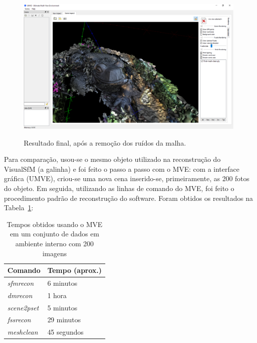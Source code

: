 \begin{figure}[!h]
	\centering
	\caption{%
	Resultado final, após a remoção dos ruídos da malha.
	}
	\includegraphics[width=1\linewidth]{figs/mvemeshclean.png}
		\label{fig:MVEMeshClean}
\end{figure} 

\newpage

Para comparação, usou-se o mesmo objeto utilizado na reconstrução do VisualSfM (a
galinha) e foi feito o passo a passo com o MVE: com a interface gráfica (UMVE),
criou-se uma nova cena inserido-se, primeiramente, as 200 fotos do objeto. Em
seguida, utilizando as linhas de comando do MVE, foi feito o procedimento padrão
de reconstrução do software. Foram obtidos os resultados na Tabela~\ref{tab:galinha200mve}:

\begin{table}[!h]
\centering
\caption{Tempos obtidos usando o MVE em um conjunto de dados em ambiente interno com 200 imagens}
\label{tab:galinha200mve}
\begin{tabular}{|l|l|}
\hline
Comando            & Tempo (aprox.)         \\ \hline
\emph{sfmrecon}  & 6 minutos   \\ \hline
\emph{dmrecon}   & 1 hora \\ \hline
\emph{scene2pset} & 5 minutos   \\ \hline
\emph{fssrecon}  & 29 minutos \\ \hline
\emph{meshclean} & 45 segundos    \\ \hline
\end{tabular}
\end{table}

